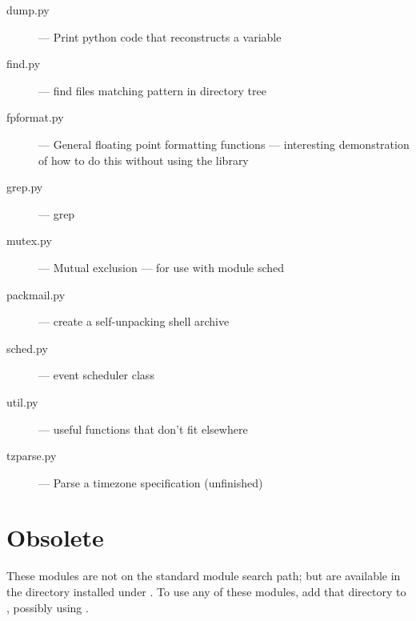 \begin{description}
\item[dump.py]
--- Print python code that reconstructs a variable

\item[find.py]
--- find files matching pattern in directory tree

\item[fpformat.py]
--- General floating point formatting functions ---
interesting demonstration of how to do this without using the \C{}
library

\item[grep.py]
--- grep

\item[mutex.py]
--- Mutual exclusion --- for use with module sched

\item[packmail.py]
--- create a self-unpacking \UNIX{} shell archive

\item[sched.py]
--- event scheduler class

\item[util.py]
--- useful functions that don't fit elsewhere

\item[tzparse.py]
--- Parse a timezone specification (unfinished)
\end{description}


\section{Obsolete}

These modules are not on the standard module search path;
but are available in the directory  installed  under
. %
To use any of these modules, add that directory to ,
possibly using .

